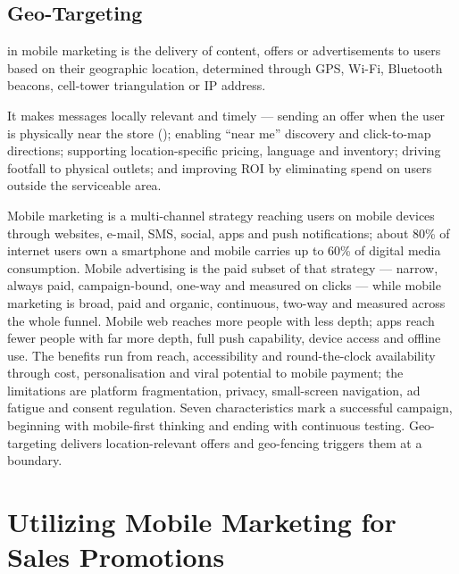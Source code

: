 \section{Geo-Targeting}

\begin{definitionbox}
 in mobile marketing is the delivery of
content, offers or advertisements to users based on their geographic location,
determined through GPS, Wi-Fi, Bluetooth beacons, cell-tower triangulation or IP
address.
\end{definitionbox}

\begin{exambox}
It makes messages locally relevant and timely --- sending an offer when the user
is physically near the store (); enabling
``near me'' discovery and click-to-map directions; supporting location-specific
pricing, language and inventory; driving footfall to physical outlets; and
improving ROI by eliminating spend on users outside the serviceable area.
\end{exambox}

\begin{summarybox}
Mobile marketing is a multi-channel strategy reaching users on mobile devices
through websites, e-mail, SMS, social, apps and push notifications; about 80\% of
internet users own a smartphone and mobile carries up to 60\% of digital media
consumption. Mobile advertising is the paid subset of that strategy --- narrow,
always paid, campaign-bound, one-way and measured on clicks --- while mobile
marketing is broad, paid and organic, continuous, two-way and measured across the
whole funnel. Mobile web reaches more people with less depth; apps reach fewer
people with far more depth, full push capability, device access and offline use.
The benefits run from reach, accessibility and round-the-clock availability
through cost, personalisation and viral potential to mobile payment; the
limitations are platform fragmentation, privacy, small-screen navigation, ad
fatigue and consent regulation. Seven characteristics mark a successful campaign,
beginning with mobile-first thinking and ending with continuous testing.
Geo-targeting delivers location-relevant offers and geo-fencing triggers them at a
boundary.
\end{summarybox}

\chapter{Utilizing Mobile Marketing for Sales Promotions}


